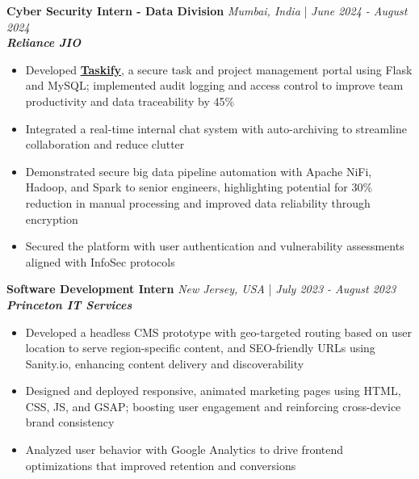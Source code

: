 \documentclass[a4paper]{article}
\begin{document}
\textbf{Cyber Security Intern - Data Division} \hfill  \textit{Mumbai, India} | \textit{June 2024 - August 2024} \\ 
\textit{\textbf{Reliance JIO}}
\vspace{-2.5mm}
\begin{itemize} \itemsep -4pt 
    \item Developed \textbf{\href{https://github.com/ShatakshiRanjan/JIOWebDesign}{Taskify}}, a secure task and project management portal using Flask and MySQL; implemented audit logging and access control to improve team productivity and data traceability by 45\%
    \item Integrated a real-time internal chat system with auto-archiving to streamline collaboration and reduce clutter
    \item Demonstrated secure big data pipeline automation with Apache NiFi, Hadoop, and Spark to senior engineers, highlighting potential for 30\% reduction in manual processing and improved data reliability through encryption
    \item Secured the platform with user authentication and vulnerability assessments aligned with InfoSec protocols
\end{itemize}

\vspace{-2mm}
\textbf{Software Development Intern} \hfill \textit{New Jersey, USA} | \textit{July 2023 - August 2023} \\
\textit{\textbf{Princeton IT Services}}
\vspace{-2.5mm}
\begin{itemize} \itemsep -4pt
    \item Developed a headless CMS prototype with geo-targeted routing based on user location to serve region-specific content, and SEO-friendly URLs using Sanity.io, enhancing content delivery and discoverability
    \item Designed and deployed responsive, animated marketing pages using HTML, CSS, JS, and GSAP; boosting user engagement and reinforcing cross-device brand consistency
    \item Analyzed user behavior with Google Analytics to drive frontend optimizations that improved retention and conversions 
\end{itemize}
\vspace{-2mm}
\end{document}
